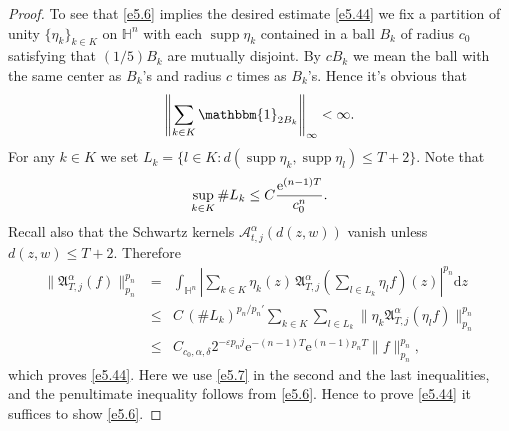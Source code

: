 \documentclass[11pt]{amsproc}
\newcommand{\e}{\mathrm{e}}
\newcommand{\indicator}{\mathbbm{1}}
\newcommand{\supp}{\mathop{\mathrm{supp}}}
\newcommand{\0}{\mathbf{0}}
\newcommand{\CK}{\mathscr{A}}
\renewcommand{\H}{\mathbb{H}}
\renewcommand{\d}{\mathrm{d}}
\numberwithin{equation}{section}
\numberwithin{figure}{section}
\theoremstyle{definition}
\theoremstyle{remark}
\numberwithin{thm}{section}
\begin{document}
\begin{proof}
To see that \eqref{e5.6} implies the desired estimate \eqref{e5.44} we fix a partition of unity $\{\eta_k\}_{k\in K}$ on $\H^n$ with each $\supp \eta_k$ contained in a ball $B_k$ of radius $c_0$ satisfying that $(1/5)B_k$ are mutually disjoint. By $cB_k$ we mean the ball with the same center as $B_k$'s and radius $c$ times as $B_k$'s. Hence it's obvious that
\begin{eqnarray}\label{e5.7}
\left\|\sum_{k\in K}\indicator_{2B_k}\right\|_\infty<\infty.
\end{eqnarray}
For any $k\in K$ we set $L_k=\{l\in K:d(\supp\eta_k,\supp\eta_l)\leq T+2\}$. Note that
\begin{eqnarray*}
\sup_{k\in K}\# L_k
\leq C{\e^{(n-1)T}\over c_0^n}.
\end{eqnarray*}
Recall also that the Schwartz kernels $\CK^\alpha_{t,j}(d(z,w))$ vanish unless $d(z,w)\leq T+2$. Therefore
\begin{eqnarray*}
\|{\mathfrak A}^\alpha_{T,j}(f)\|^{p_n}_{p_n}&=&\int_{\H^n}\left|\sum_{k\in K}\eta_k(z)\,{\mathfrak A}^\alpha_{T,j}\!\left(\sum_{l\in L_k}\eta_lf\right)\!(z)\right|^{p_n}\d z\\
&\leq&C\,(\# L_k)^{p_n/p_n'}\sum_{k\in K}\sum_{l\in L_k}\|\eta_k{\mathfrak A}^\alpha_{T,j}(\eta_lf)\|_{p_n}^{p_n}\\
&\leq& C_{c_0,\alpha,\delta}2^{-\varepsilon p_nj}\e^{-(n-1)T}\e^{(n-1)p_nT}\|f\|_{p_n}^{p_n},
\end{eqnarray*}
which proves \eqref{e5.44}. Here we use \eqref{e5.7} in the second and the last inequalities, and the penultimate inequality follows from \eqref{e5.6}. Hence to prove \eqref{e5.44} it suffices to show \eqref{e5.6}.


\end{proof}
\end{document}
